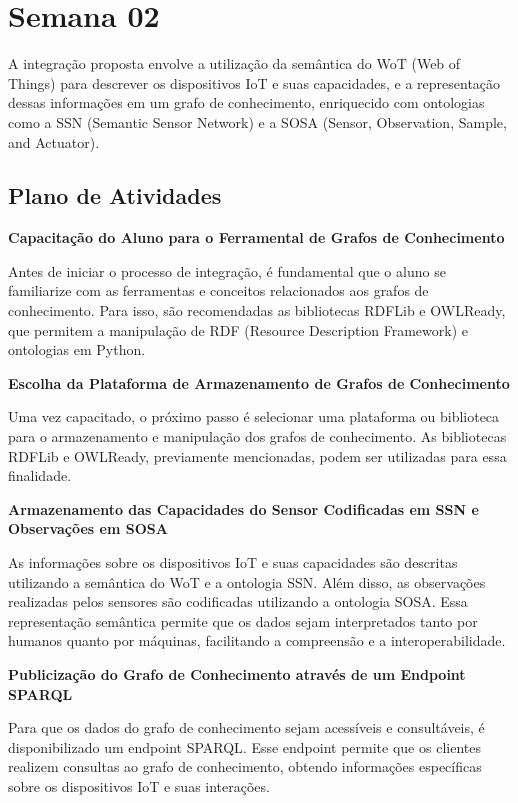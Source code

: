 \section{Semana 02}


A integração proposta envolve a utilização da semântica do WoT (Web of Things) para descrever os dispositivos IoT e suas capacidades, e a representação dessas informações em um grafo de conhecimento, enriquecido com ontologias como a SSN (Semantic Sensor Network) e a SOSA (Sensor, Observation, Sample, and Actuator).

\subsection{Plano de Atividades}

\textbf{Capacitação do Aluno para o Ferramental de Grafos de Conhecimento}

Antes de iniciar o processo de integração, é fundamental que o aluno se familiarize com as ferramentas e conceitos relacionados aos grafos de conhecimento. Para isso, são recomendadas as bibliotecas RDFLib e OWLReady, que permitem a manipulação de RDF (Resource Description Framework) e ontologias em Python.

\textbf{Escolha da Plataforma de Armazenamento de Grafos de Conhecimento}

Uma vez capacitado, o próximo passo é selecionar uma plataforma ou biblioteca para o armazenamento e manipulação dos grafos de conhecimento. As bibliotecas RDFLib e OWLReady, previamente mencionadas, podem ser utilizadas para essa finalidade.

\textbf{Armazenamento das Capacidades do Sensor Codificadas em SSN e Observações em SOSA}

As informações sobre os dispositivos IoT e suas capacidades são descritas utilizando a semântica do WoT e a ontologia SSN. Além disso, as observações realizadas pelos sensores são codificadas utilizando a ontologia SOSA. Essa representação semântica permite que os dados sejam interpretados tanto por humanos quanto por máquinas, facilitando a compreensão e a interoperabilidade.

\textbf{Publicização do Grafo de Conhecimento através de um Endpoint SPARQL}

Para que os dados do grafo de conhecimento sejam acessíveis e consultáveis, é disponibilizado um endpoint SPARQL. Esse endpoint permite que os clientes realizem consultas ao grafo de conhecimento, obtendo informações específicas sobre os dispositivos IoT e suas interações.

